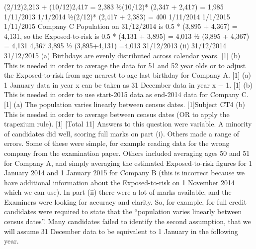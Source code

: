 (2/12)2,213 + (10/12)2,417
= 2,383
1⁄2(10/12)*
(2,347 + 2,417)
= 1,985
1/11/2013
1/1/2014
1⁄2(2/12)*
(2,417 + 2,383)
= 400
1/11/2014
1/1/2015
1/11/2015
Company C
Population on 31/12/2014 is 0.5 * (3,895 + 4,367) = 4,131, 
so the Exposed-to-risk is 0.5 * (4,131 + 3,895) = 4,013 
1⁄2 (3,895 + 4,367)
= 4,131
4,367
3,895
1⁄2 (3,895+4,131)
=4,013
31/12/2013
(ii)
31/12/2014
31/12/2015
(a) Birthdays are evenly distributed across calendar years. [1]
(b) This is needed in order to average the data for 51 and 52 year olds or
to adjust the Exposed-to-risk from age nearest to age last birthday for
Company A. [1]
(a) 1 January data in year x can be taken as 31 December data in year x − 1. [1]
(b) This is needed in order to use start-2015 data as end-2014 data for Company
C.
[1]
(a) The population varies linearly between census dates.
[1]Subject CT4 %
(b)
This is needed in order to average between census dates (OR to apply the
trapezium rule).
[1]
[Total 11]
Answers to this question were variable. A minority of candidates did well,
scoring full marks on part (i). Others made a range of errors. Some of these
were simple, for example reading data for the wrong company from the
examination paper. Others included averaging ages 50 and 51 for Company
A, and simply averaging the estimated Exposed-to-risk figures for 1 January
2014 and 1 January 2015 for Company B (this is incorrect because we have
additional information about the Exposed-to-risk on 1 November 2014 which
we can use). In part (ii) there were a lot of marks available, and the
Examiners were looking for accuracy and clarity. So, for example, for full
credit candidates were required to state that the “population varies linearly
between census dates”. Many candidates failed to identify the second
assumption, that we will assume 31 December data to be equivalent to
1 January in the following year.
